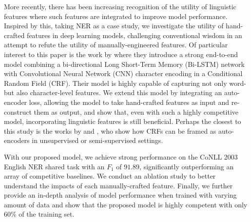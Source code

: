 More recently, there has been increasing recognition of the utility of linguistic features \cite{Li+:2017,Chen+:2017,Wu+:2017,Liu+:2018} where such features are integrated to improve model performance. 
Inspired by this, taking NER as a case study, we investigate the utility of hand-crafted features in deep learning models, challenging conventional wisdom in an attempt to refute the utility of manually-engineered features.
Of particular interest to this paper is the work by  where they introduce a strong end-to-end model combining a
bi-directional Long Short-Term Memory (Bi-LSTM) network with Convolutional Neural Network (CNN) character encoding in a Conditional Random Field (CRF).
Their model is highly capable of capturing not only word- but also character-level features. 
We extend this model by integrating an auto-encoder loss, allowing the model to take hand-crafted features as input and re-construct them as output, and show that, even with such a highly competitive model, incorporating linguistic features is still beneficial.
Perhaps the closest to this study is the works by  and , who show how CRFs can be framed as auto-encoders in unsupervised or semi-supervised settings. 

With our proposed model, we achieve strong performance on the CoNLL 2003 English NER shared task with an $F_1$ of $91.89$, significantly outperforming an array of competitive baselines. We conduct an ablation study to better understand the impacts of each manually-crafted feature. Finally, we further provide an in-depth analysis of model performance when trained with varying amount of data and show that the proposed model is highly competent with only 60\% of the training set.
